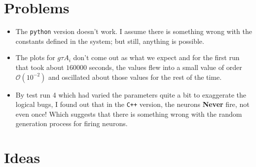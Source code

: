 \documentclass[a4paper, 12pt]{article}
\begin{document}
	\section{Problems}
	\begin{itemize}
		\item The \texttt{python} version doesn't work. I assume there is something
		wrong with the constants defined in the system; but still, anything is possible.
		
		\item The plots for $g\tau A_{i}$ don't come out as what we expect and for 
		the first run that took about $160000$ seconds, the values flew into a small 
		value of order $\mathcal{O}(10^{-2})$ and oscillated about those values for
		the rest of the time.

		\item By test run 4 which had varied the parameters quite a bit to exaggerate the logical bugs,
		I found out that in the \texttt{C++} version, the neurons \textbf{Never} fire, not even once! Which 
		suggests that there is something wrong with the random generation process for firing neurons.
	\end{itemize}

	\section{Ideas}
	
\end{document}
